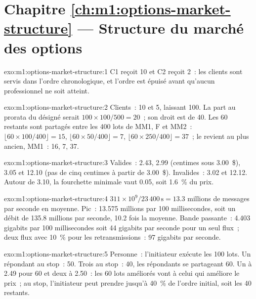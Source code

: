\section*{Chapitre \ref{ch:m1:options-market-structure} --- Structure du marché des options}

\begin{solution}{exo:m1:options-market-structure:1}
C1 reçoit 10 et C2 reçoit 2~: les clients sont servis dans l'ordre chronologique, et l'ordre
est épuisé avant qu'aucun professionnel ne soit atteint.
\end{solution}

\begin{solution}{exo:m1:options-market-structure:2}
Clients~: 10 et 5, laissant 100. La part au prorata du  désigné
serait $100 \times 100/500 = 20$~; son droit est de 40. Les 60 restants sont
partagés entre les 400 lots de MM1, F et MM2~: $\lfloor 60 \times 100/400\rfloor
= 15$, $\lfloor 60 \times 50/400\rfloor = 7$, $\lfloor 60 \times 250/400\rfloor
= 37$~; le  revient au plus ancien, MM1~: 16, 7, 37.
\end{solution}

\begin{solution}{exo:m1:options-market-structure:3}
Valides~: 2.43, 2.99 (centimes sous 3.00~\$), 3.05 et 12.10 (pas de cinq centimes à partir de
3.00~\$). Invalides~: 3.02 et 12.12. Autour de 3.10, la fourchette minimale vaut 0.05, soit
1.6~\% du prix.
\end{solution}

\begin{solution}{exo:m1:options-market-structure:4}
$311 \times 10^9 / 23\,400\,\text{s} = 13.3$ millions de messages par seconde en
moyenne. Pic~: 13.575 millions par 100 millisecondes, soit un débit de 135.8 millions par
seconde, 10.2 fois la moyenne. Bande passante~: 4.403 gigabits par 100 millisecondes
soit 44 gigabits par seconde pour un seul flux~; deux flux avec 10~\% pour
les retransmissions~: 97 gigabits par seconde.
\end{solution}

\begin{solution}{exo:m1:options-market-structure:5}
Personne~: l'initiateur exécute les 100 lots. Un répondant au stop~: 50. Trois
au stop~: 40, les répondants se partageant 60. Un à 2.49 pour 60 et deux à 2.50~:
les 60 lots améliorés vont à celui qui améliore le prix~; au stop, l'initiateur peut prendre
jusqu'à 40~\% de l'ordre initial, soit les 40 restants.
\end{solution}

